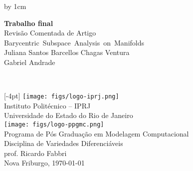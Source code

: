 \begin{titlepage}
\renewcommand{\title}{%
  {\LARGE Revisão Comentada de Artigo}\\
  \mbox{Barycentric Subspace Analysis on Manifolds}%
}
\renewcommand{\author}{Juliana Santos Barcellos Chagas Ventura\\ Gabriel Andrade}
\renewcommand{\date}{\today}
\newcommand{\info}{%
  \raisebox{4pt}[-4pt]{%
  \texttt{[image: figs/logo-iprj.png]} 
  \hspace{0.1in}
  }\\

  Instituto Politécnico -- IPRJ\\
  Universidade do Estado do Rio de Janeiro\\[2em]
  
  \texttt{[image: figs/logo-ppgmc.png]}\\
  Programa de Pós Graduação em Modelagem Computacional\\
  Disciplina de Variedades Diferenciáveis\\
  prof. Ricardo Fabbri\\[1em]

  Nova Friburgo, \date\\[1.5cm]
}

\newlength{\topToTitle} 
\setlength{\topToTitle}{0pt}

\newlength{\leftToTitle} 
\setlength{\leftToTitle}{-60pt}

\newlength{\titleToInfo} 
\setlength{\titleToInfo}{9.5cm}

\newlength{\myTextWidth}
\setlength{\myTextWidth}{\textwidth}
\advance\myTextWidth by 1cm


\thispagestyle{empty}
\vspace*{\topToTitle}
\begin{minipage}{\myTextWidth}
  \sffamily
  \hspace*{\leftToTitle}\begin{minipage}{11cm}
    \Large\textbf{Trabalho final}\\[1.5cm]
    \title\\[1.5cm]
    \author
  \end{minipage}\\

  \vspace*{\titleToInfo}

  \begin{minipage}{\textwidth}
    \flushright
    \info
  \end{minipage}
\end{minipage}%
\end{titlepage}
